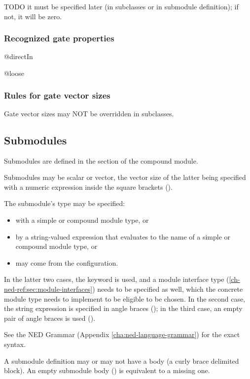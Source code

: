 TODO it must be specified later (in subclasses or in submodule definition);
if not, it will be zero.


\subsubsection{Recognized gate properties}

@directIn

@loose


\subsubsection{Rules for gate vector sizes}

Gate vector sizes may NOT be overridden in subclasses.



\subsection{Submodules}
\label{ch-ned-ref:sec:submodules}

Submodules are defined in the  section of the compound module.

Submodules may be scalar or vector, the vector size of the latter being
specified with a numeric expression inside the square brackets (\ttt{[...]}).

The submodule's type may be specified:

\begin{itemize}
  \item with a simple or compound module type, or
  \item by a string-valued expression that evaluates to the name of a
        simple or compound module type, or
  \item may come from the configuration.
\end{itemize}

In the latter two cases, the  keyword is used, and a
module interface type (\ref{ch-ned-ref:sec:module-interfaces})
needs to be specified as well, which the concrete module type needs
to implement to be eligible to be chosen. In the second case, the
string expression is specified in angle braces (); in the
third case, an empty pair of angle braces is used (\ttt{<>}).

See the NED Grammar (Appendix \ref{cha:ned-language-grammar}) for the
exact syntax.

A submodule definition may or may not have a body (a curly brace
delimited block). An empty submodule body (\ttt{\{ \}}) is equivalent
to a missing one.

